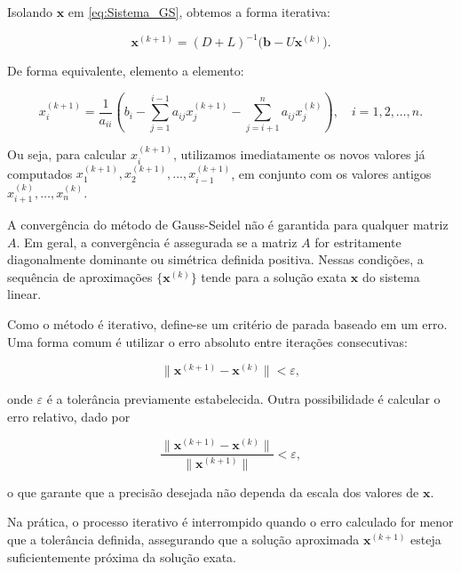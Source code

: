         Isolando $\mathbf{x}$ em \eqref{eq:Sistema_GS}, obtemos a forma iterativa:
        
        \begin{equation}
        \mathbf{x}^{(k+1)} = (D + L)^{-1}\big(\mathbf{b} - U \mathbf{x}^{(k)}\big).
        \label{eq:Metodo_GS_Matricial}
        \end{equation}
        
        De forma equivalente, elemento a elemento:
        
        \begin{equation}
        x_i^{(k+1)} = \frac{1}{a_{ii}}
        \left( b_i - \sum_{j=1}^{i-1} a_{ij} x_j^{(k+1)} - \sum_{j=i+1}^n a_{ij} x_j^{(k)} \right),
        \quad i = 1, 2, \ldots, n.
        \label{eq:Metodo_GS_Algebrico}
        \end{equation}
        
        \noindent Ou seja, para calcular $x_i^{(k+1)}$, utilizamos imediatamente os novos valores já computados $x_1^{(k+1)}, x_2^{(k+1)}, \ldots, x_{i-1}^{(k+1)}$, em conjunto com os valores antigos $x_{i+1}^{(k)}, \ldots, x_{n}^{(k)}$.
        
        \medskip
        
        A convergência do método de Gauss-Seidel não é garantida para qualquer matriz $A$. Em geral, a convergência é assegurada se a matriz $A$ for estritamente diagonalmente dominante ou simétrica definida positiva. Nessas condições, a sequência de aproximações $\{\mathbf{x}^{(k)}\}$ tende para a solução exata $\mathbf{x}$ do sistema linear.
        
        Como o método é iterativo, define-se um critério de parada baseado em um erro. Uma forma comum é utilizar o erro absoluto entre iterações consecutivas:
        
        \[
        \| \mathbf{x}^{(k+1)} - \mathbf{x}^{(k)} \| < \varepsilon,
        \]
        
        onde $\varepsilon$ é a tolerância previamente estabelecida. Outra possibilidade é calcular o erro relativo, dado por
        
        \[
        \frac{\| \mathbf{x}^{(k+1)} - \mathbf{x}^{(k)} \|}{\| \mathbf{x}^{(k+1)} \|} < \varepsilon,
        \]
        
        o que garante que a precisão desejada não dependa da escala dos valores de $\mathbf{x}$.
        
        Na prática, o processo iterativo é interrompido quando o erro calculado for menor que a tolerância definida, assegurando que a solução aproximada $\mathbf{x}^{(k+1)}$ esteja suficientemente próxima da solução exata.